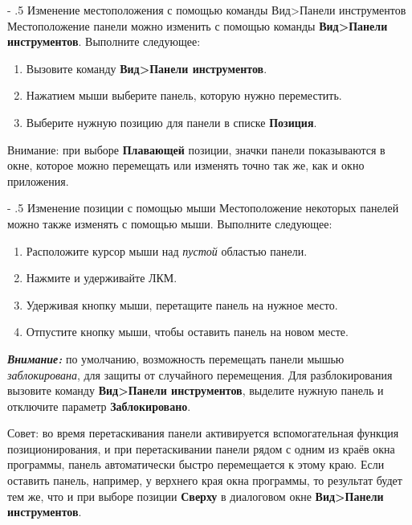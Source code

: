 ﻿\documentclass[a4paper,10pt]{article}
\makeatletter
\renewcommand\paragraph{%
   \@startsection{paragraph}{4}{0mm}%
      {-\baselineskip}%
      {.5\baselineskip}%
      {\normalfont\normalsize\bfseries}}
\makeatother
\begin{document}
\paragraph{Изменение местоположения с помощью команды Вид>Панели инструментов}
Местоположение панели можно изменить с помощью команды \textbf{Вид>Панели инструментов}. Выполните следующее:
\begin{enumerate}
 \item Вызовите команду \textbf{Вид>Панели инструментов}.
 \item Нажатием мыши выберите панель, которую нужно переместить.
 \item Выберите нужную позицию для панели в списке \textbf{Позиция}.
\end{enumerate}

Внимание: при выборе \textbf{Плавающей} позиции, значки панели показываются в окне, которое можно перемещать или изменять точно так же, как и окно приложения.

\paragraph{Изменение позиции с помощью мыши}
Местоположение некоторых панелей можно также изменять с помощью мыши. Выполните следующее:
\begin{enumerate}
 \item Расположите курсор мыши над \textit{пустой} областью панели.
 \item Нажмите и удерживайте ЛКМ.
 \item Удерживая кнопку мыши, перетащите панель на нужное место.
 \item Отпустите кнопку мыши, чтобы оставить панель на новом месте.
\end{enumerate}

\begin{mdframed}[backgroundcolor=blue!10]
\textbf{\textit{Внимание:}} по умолчанию, возможность перемещать панели мышью \textit{заблокирована}, для защиты от случайного перемещения. Для разблокирования вызовите команду \textbf{Вид>Панели инструментов}, выделите нужную панель и отключите параметр \textbf{Заблокировано}.
\end{mdframed}

 Совет: во время перетаскивания панели активируется вспомогательная функция позиционирования, и при перетаскивании панели рядом с одним из краёв окна программы, панель автоматически быстро перемещается к этому краю. Если оставить панель, например, у верхнего края окна программы, то результат будет тем же, что и при выборе позиции \textbf{Сверху} в диалоговом окне \textbf{Вид>Панели инструментов}.
\end{document}
